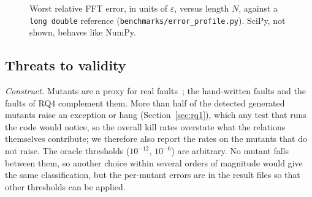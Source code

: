 \documentclass[10pt,conference]{IEEEtran}
\newcommand{\eps}{\varepsilon}
\newcommand{\code}[1]{\texttt{#1}}
\begin{document}
\begin{figure}[t]
\centering
{}
\caption{Worst relative FFT error, in units of $\eps$, versus length $N$, against a
\code{long double} reference (\code{benchmarks/error\_profile.py}). SciPy, not shown,
behaves like NumPy.}
\label{fig:profile}
\end{figure}

\subsection{Threats to validity}
\emph{Construct.} Mutants are a proxy for real faults~\cite{just2014mutants};
the hand-written faults and the faults of RQ4 complement them. More than half
of the detected generated mutants raise an exception or hang
(Section~\ref{sec:rq1}), which any test that runs the code would notice, so the
overall kill rates overstate what the relations themselves contribute; we
therefore also report the rates on the mutants that do not raise. The oracle
thresholds ($10^{-12}$, $10^{-6}$) are arbitrary. No mutant falls between
them, so another choice within several orders of magnitude would give the same
classification, but the per-mutant errors are in the result files so that
other thresholds can be applied.
\end{document}
